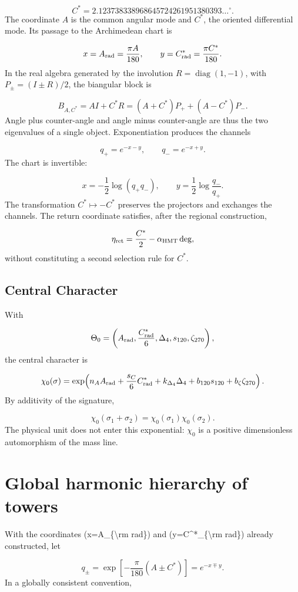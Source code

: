 \[
 C^*=2.123738338968645724261951380393\ldots{}^\circ.
\]
The coordinate \(A\) is the common angular mode and \(C^*\), the oriented differential mode. Its passage to the Archimedean chart is

\[
 x=A_{\rm rad}=\frac{\pi A}{180},
 \qquad
 y=C^*_{\rm rad}=\frac{\pi C^*}{180}.
\]
In the real algebra generated by the involution \(R=\operatorname{diag}(1,-1)\), with \(P_\pm=(I\pm R)/2\), the biangular block is

\[
 B_{A,C^*}=AI+C^*R
 =(A+C^*)P_++(A-C^*)P_-.
\]
Angle plus counter-angle and angle minus counter-angle are thus the two eigenvalues of a single object. Exponentiation produces the channels

\[
 q_+=e^{-x-y},\qquad q_-=e^{-x+y}.
\]
The chart is invertible:

\[
 x=-\frac12\log(q_+q_-),
 \qquad
 y=\frac12\log\frac{q_-}{q_+}.
\]
The transformation \(C^*\mapsto-C^*\) preserves the projectors and exchanges the channels. The return coordinate satisfies, after the regional construction,

\[
 \eta_{\rm ret}=\frac{C^*}{2}-\alpha_{\rm HMT}\,{\rm deg},
\]
without constituting a second selection rule for \(C^*\).

\subsection{Central Character}
With

\[
 \Theta_0=
 \left(A_{\rm rad},\frac{C^*_{\rm rad}}6,
 \Delta_4,s_{120},\zeta_{270}\right),
\]
the central character is

\[
 \chi_0(\sigma)=
 \exp\!\left(
 n_AA_{\rm rad}+\frac{s_C}{6}C^*_{\rm rad}
 +k_{\Delta_4}\Delta_4+b_{120}s_{120}+b_\zeta\zeta_{270}
 \right).
\]
By additivity of the signature,

\[
 \chi_0(\sigma_1+\sigma_2)=\chi_0(\sigma_1)\chi_0(\sigma_2).
\]
The physical unit does not enter this exponential: \(\chi_0\) is a positive dimensionless automorphism of the mass line.

\section{Global harmonic hierarchy of towers}
With the coordinates (x=\allowbreak{}A\_\{\textbackslash{}rm rad\}) and (y=\allowbreak{}C\textasciicircum{}*\_\{\textbackslash{}rm rad\}) already constructed, let

\[
 q_\pm=\exp\!\left[-\frac{\pi}{180}(A\pm C^*)\right]
 =e^{-x\mp y}.
\]
In a globally consistent convention,


